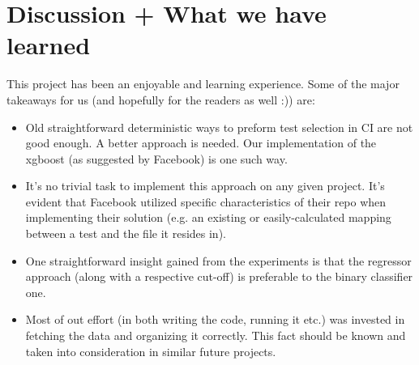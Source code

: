 \documentclass{article}
\begin{document}
\label{fig:regressor}



\section{Discussion + What we have learned}

This project has been an enjoyable and learning experience. Some of the major takeaways for us (and hopefully for the readers as well :)) are:

\begin{itemize}
\item Old straightforward deterministic ways to preform test selection in CI are not good enough. A better approach is needed. Our implementation of the xgboost (as suggested by Facebook) is one such way.
\item It's no trivial task to implement this approach on any given project. It's evident that Facebook utilized specific characteristics of their repo when implementing their solution (e.g. an existing or easily-calculated mapping between a test and the file it resides in).
\item One straightforward insight gained from the experiments is that the regressor approach (along with a respective cut-off) is preferable to the binary classifier one.
\item Most of out effort (in both writing the code, running it etc.) was invested in fetching the data and organizing it correctly. This fact should be known and taken into consideration in similar future projects.
\end{itemize}
\end{document}
